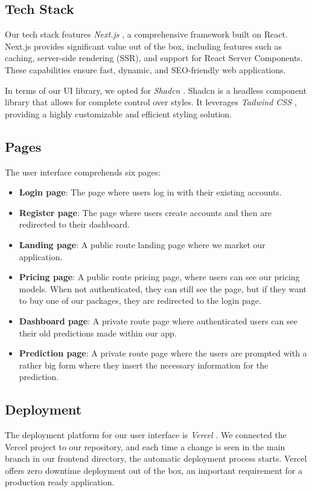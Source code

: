 \subsection{Tech Stack}
Our tech stack features \textit{Next.js} \cite{nextjs}, a comprehensive framework built on React. Next.js provides significant value out of the box, including features such as caching, server-side rendering (SSR), and support for React Server Components. These capabilities ensure fast, dynamic, and SEO-friendly web applications.

In terms of our UI library, we opted for \textit{Shadcn} \cite{shadcn}. Shadcn is a headless component library that allows for complete control over styles. It leverages \textit{Tailwind CSS} \cite{tailwind_css}, providing a highly customizable and efficient styling solution.

\subsection{Pages}
The user interface comprehends six pages:

\begin{itemize}
    \item \textbf{Login page}: The page where users log in with their existing accounts.
    \item \textbf{Register page}: The page where users create accounts and then are redirected to their dashboard.
    \item \textbf{Landing page}: A public route landing page where we market our application.
    \item \textbf{Pricing page}: A public route pricing page, where users can see our pricing models. When not authenticated, they can still see the page, but if they want to buy one of our packages, they are redirected to the login page.
    \item \textbf{Dashboard page}: A private route page where authenticated users can see their old predictions made within our app.
    \item \textbf{Prediction page}: A private route page where the users are prompted with a rather big form where they insert the necessary information for the prediction.
\end{itemize}

\subsection{Deployment}
The deployment platform for our user interface is \textit{Vercel} \cite{vercel}. We connected the Vercel project to our repository, and each time a change is seen in the main branch in our frontend directory, the automatic deployment process starts. Vercel offers zero downtime deployment out of the box, an important requirement for a production ready application.
